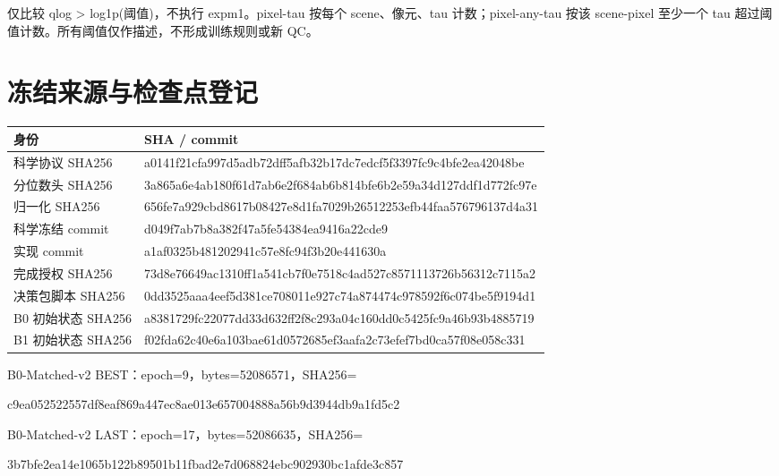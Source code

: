 \documentclass[UTF8,a4paper,11pt,fontset=windows]{ctexart}
\begin{document}
仅比较 qlog > log1p(阈值)，不执行 expm1。pixel-tau 按每个 scene、像元、tau 计数；pixel-any-tau 按该 scene-pixel 至少一个 tau 超过阈值计数。所有阈值仅作描述，不形成训练规则或新 QC。
\clearpage\section{冻结来源与检查点登记}
\begin{longtable}{p{36mm}p{116mm}}\toprule 身份 & SHA / commit\\\midrule\endhead
科学协议 SHA256 & {\footnotesize\ttfamily a0141f21cfa997d5adb72dff5afb32b17dc7edcf5f3397fc9c4bfe2ea42048be}\\
分位数头 SHA256 & {\footnotesize\ttfamily 3a865a6e4ab180f61d7ab6e2f684ab6b814bfe6b2e59a34d127ddf1d772fc97e}\\
归一化 SHA256 & {\footnotesize\ttfamily 656fe7a929cbd8617b08427e8d1fa7029b26512253efb44faa576796137d4a31}\\
科学冻结 commit & {\footnotesize\ttfamily d049f7ab7b8a382f47a5fe54384ea9416a22cde9}\\
实现 commit & {\footnotesize\ttfamily a1af0325b481202941c57e8fc94f3b20e441630a}\\
完成授权 SHA256 & {\footnotesize\ttfamily 73d8e76649ac1310ff1a541cb7f0e7518c4ad527c8571113726b56312c7115a2}\\
决策包脚本 SHA256 & {\footnotesize\ttfamily 0dd3525aaa4eef5d381ce708011e927c74a874474c978592f6c074be5f9194d1}\\
B0 初始状态 SHA256 & {\footnotesize\ttfamily a8381729fc22077dd33d632ff2f8c293a04c160dd0c5425fc9a46b93b4885719}\\
B1 初始状态 SHA256 & {\footnotesize\ttfamily f02fda62c40e6a103bae61d0572685ef3aafa2c73efef7bd0ca57f08e058c331}\\
\bottomrule\end{longtable}
B0-Matched-v2 BEST：epoch=9，bytes=52086571，SHA256=\par
{\footnotesize\ttfamily c9ea052522557df8eaf869a447ec8ae013e657004888a56b9d3944db9a1fd5c2}\par
{\footnotesize{}}\par
B0-Matched-v2 LAST：epoch=17，bytes=52086635，SHA256=\par
{\footnotesize\ttfamily 3b7bfe2ea14e1065b122b89501b11fbad2e7d068824ebc902930bc1afde3c857}\par
{\footnotesize{}}\par
\end{document}
